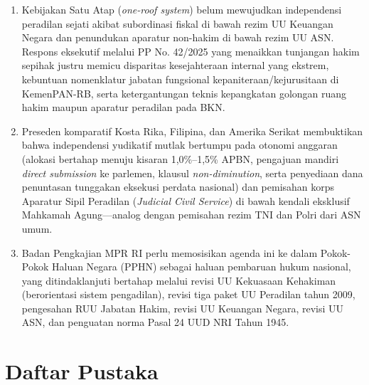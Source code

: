 \documentclass[12pt,a4paper,twocolumn]{article}
\begin{document}
\begin{enumerate}[topsep=2pt, itemsep=1.5pt, parsep=0pt]
    \item Kebijakan Satu Atap (\textit{one-roof system}) belum mewujudkan independensi peradilan sejati akibat subordinasi fiskal di bawah rezim UU Keuangan Negara dan penundukan aparatur non-hakim di bawah rezim UU ASN. Respons eksekutif melalui PP No. 42/2025 yang menaikkan tunjangan hakim sepihak justru memicu disparitas kesejahteraan internal yang ekstrem, kebuntuan nomenklatur jabatan fungsional kepaniteraan/kejurusitaan di KemenPAN-RB, serta ketergantungan teknis kepangkatan golongan ruang hakim maupun aparatur peradilan pada BKN.
    \item Preseden komparatif Kosta Rika, Filipina, dan Amerika Serikat membuktikan bahwa independensi yudikatif mutlak bertumpu pada otonomi anggaran (alokasi bertahap menuju kisaran 1,0\%--1,5\% APBN, pengajuan mandiri \textit{direct submission} ke parlemen, klausul \textit{non-diminution}, serta penyediaan dana penuntasan tunggakan eksekusi perdata nasional) dan pemisahan korps Aparatur Sipil Peradilan (\textit{Judicial Civil Service}) di bawah kendali eksklusif Mahkamah Agung—analog dengan pemisahan rezim TNI dan Polri dari ASN umum.
    \item Badan Pengkajian MPR RI perlu memosisikan agenda ini ke dalam Pokok-Pokok Haluan Negara (PPHN) sebagai haluan pembaruan hukum nasional, yang ditindaklanjuti bertahap melalui revisi UU Kekuasaan Kehakiman (berorientasi sistem pengadilan), revisi tiga paket UU Peradilan tahun 2009, pengesahan RUU Jabatan Hakim, revisi UU Keuangan Negara, revisi UU ASN, dan penguatan norma Pasal 24 UUD NRI Tahun 1945.
\end{enumerate}

\section*{Daftar Pustaka}
\singlespacing
\fontsize{7.5}{8.8}\selectfont
\setlength{\parskip}{0pt}
\end{document}
